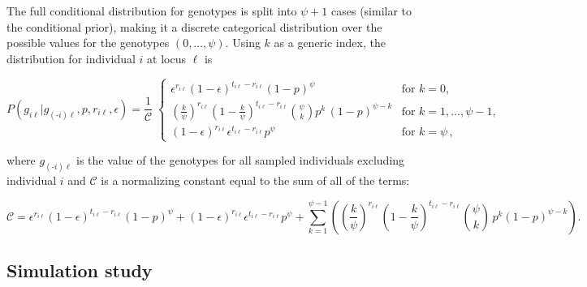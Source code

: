 \documentclass[11pt,english,letterpaper,oneside]{article}
\begin{document}
The full conditional distribution for genotypes is split into $\psi+1$ cases (similar to the conditional prior), making it a discrete categorical distribution over the possible values for the genotypes $(0,\ldots,\psi)$. Using $k$ as a generic index, the distribution for individual $i$ at locus $\ell$ is

\begin{equation}\label{G-full}
P(g_{i \ell}|g_{(\text{-}i) \ell},p,r_{i \ell},\epsilon) = \frac{1}{\mathcal{C}} \;
	\begin{cases}
	\epsilon^{r_{i \ell}}(1-\epsilon)^{t_{i \ell}-r_{i \ell}}(1-p)^\psi & \text{for  } k = 0, \\[0.05in]
	\left(\frac{k}{\psi}\right)^{r_{i \ell}}\left(1-\frac{k}{\psi}\right)^{t_{i \ell}-r_{i \ell}}\displaystyle\binom{\psi}{k}p^{k}\,(1-p)^{\psi-k} & \text{for  } k = 1,\ldots,\psi-1, \\[0.05in]
	(1-\epsilon)^{r_{i \ell}}\epsilon^{t_{i \ell}-r_{i \ell}}p^\psi & \text{for  } k = \psi\,,
	\end{cases} 
\end{equation}

\noindent where $g_{(\text{-}i) \ell}$ is the value of the genotypes for all sampled individuals excluding individual $i$ and $\mathcal{C}$ is a normalizing constant equal to the sum of all of the terms:

\begin{equation*}
\mathcal{C} = \epsilon^{r_{i \ell}}(1-\epsilon)^{t_{i \ell}-r_{i \ell}}(1-p)^\psi + (1-\epsilon)^{r_{i \ell}}\epsilon^{t_{i \ell}-r_{i \ell}}p^\psi + \sum_{k=1}^{\psi-1}\left(\left(\frac{k}{\psi}\right)^{r_{i \ell}}\left(1-\frac{k}{\psi}\right)^{t_{i \ell}-r_{i \ell}}\binom{\psi}{k}\,p^k(1-p)^{\psi-k}\right).
\end{equation*}

\medskip
\subsection*{Simulation study}
\medskip
\end{document}
